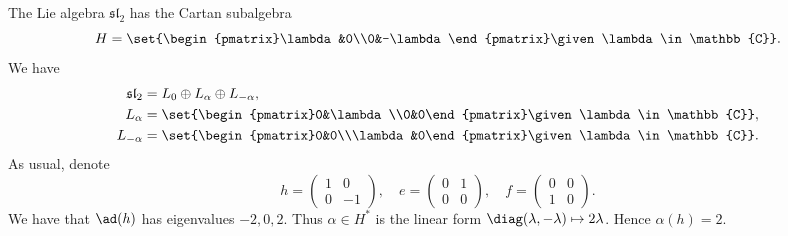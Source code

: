The Lie algebra $\mathfrak{sl}_2$ has the Cartan subalgebra
\[ H = \set{\begin{pmatrix}\lambda &0\\0&-\lambda\end{pmatrix}\given \lambda \in \mathbb{C}}.\]
We have
\begin{align*}
	\mathfrak{sl}_2 &= L_0\oplus L_{\alpha}\oplus L_{-\alpha},\\
	L_{\alpha} &= \set{\begin{pmatrix}0&\lambda\\0&0\end{pmatrix}\given \lambda \in \mathbb{C}},\\
	L_{-\alpha} &= \set{\begin{pmatrix}0&0\\\lambda&0\end{pmatrix}\given \lambda \in \mathbb{C}}.\\
\end{align*}
As usual, denote
\[ h = \begin{pmatrix}1&0\\0&-1\end{pmatrix},\quad e=\begin{pmatrix}0&1\\0&0\end{pmatrix},\quad f=\begin{pmatrix}0&0\\1&0\end{pmatrix}. \]
	We have that $\ad(h)$ has eigenvalues $-2, 0, 2$. Thus $\alpha \in H^*$ is the linear
	form $\diag(\lambda, -\lambda)\mapsto 2\lambda$. Hence $\alpha(h) = 2$.
